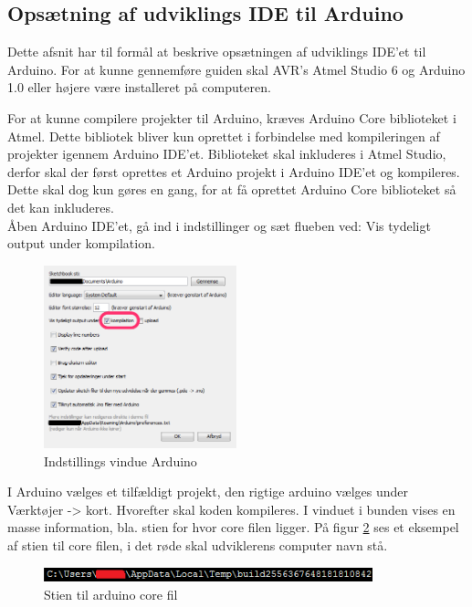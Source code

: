 \subsection{Opsætning af udviklings IDE til Arduino}

Dette afsnit har til formål at beskrive opsætningen af udviklings IDE'et til Arduino.
For at kunne gennemføre guiden skal AVR's Atmel Studio 6 og Arduino 1.0 eller højere være installeret på computeren. 

For at kunne compilere projekter til Arduino, kræves Arduino Core biblioteket i Atmel. Dette bibliotek bliver kun oprettet i forbindelse med kompileringen af projekter igennem Arduino IDE'et. Biblioteket skal inkluderes i Atmel Studio, derfor skal der først oprettes et Arduino projekt i Arduino IDE'et og kompileres. Dette skal dog kun gøres en gang, for at få oprettet Arduino Core biblioteket så det kan inkluderes.\\

Åben Arduino IDE'et, gå ind i indstillinger og sæt flueben ved: Vis tydeligt output under kompilation.

\begin{figure}[H]
	\centering
	\includegraphics[width=0.5\textwidth]{Billeder/implementation/Howtoguide/Arduino_kompiler.png}
	\caption{Indstillings vindue Arduino}
	\label{fig:arduino_indstillinger}
\end{figure}

I Arduino vælges et tilfældigt projekt, den rigtige arduino vælges under Værktøjer -> kort. Hvorefter skal koden kompileres. I vinduet i bunden vises en masse information, bla. stien for hvor core filen ligger. På figur \ref{fig:arduino_core} ses et eksempel af stien til core filen, i det røde skal udviklerens computer navn stå. 

\begin{figure}[H]
	\centering
	\includegraphics[width=0.85\textwidth]{Billeder/implementation/Howtoguide/core_sti.png}
	\caption{Stien til arduino core fil}
	\label{fig:arduino_core}
\end{figure}


